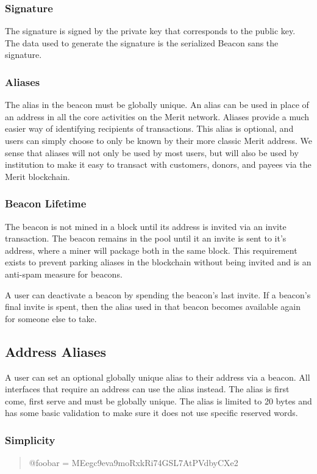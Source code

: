 \documentclass{article}
\begin{document}
\subsubsection{Signature}

The signature is signed by the private key that corresponds to the public key.
The data used to generate the signature is the serialized Beacon sans the signature.

\subsubsection{Aliases}
The alias in the beacon must be globally unique. An alias can be used in place of an
address in all the core activities on the Merit network.  Aliases provide a much easier way 
of identifying recipients of transactions. This alias is optional, and users can simply 
choose to only be known by their more classic Merit address.  We sense that aliases 
will not only be used by most users, but will also be used by institution to make
it easy to transact with customers, donors, and payees via the Merit blockchain.

\subsubsection{Beacon Lifetime}
The beacon is not mined in a block until its address is invited via an \gls{invite}
transaction. The beacon remains in the pool until it an invite is sent to it's
address, where a miner will package both in the same block. This requirement
exists to prevent parking aliases in the blockchain without being invited and
is an anti-spam measure for beacons.

A user can deactivate a beacon by spending the beacon's last invite. If a beacon's
final invite is spent, then the alias used in that beacon becomes available again
for someone else to take.

\subsection{Address Aliases}

A user can set an optional globally unique alias to their address via a beacon.
All interfaces that require an address can use the alias instead.
The alias is first come, first serve and must be globally unique.
The alias is limited to 20 bytes and has some basic validation to make sure it
does not use specific reserved words.

\subsubsection{Simplicity}
\begin{quote}
    @foobar = MEegc9eva9moRxkRi74GSL7AtPVdbyCXe2
\end{quote}
\end{document}
